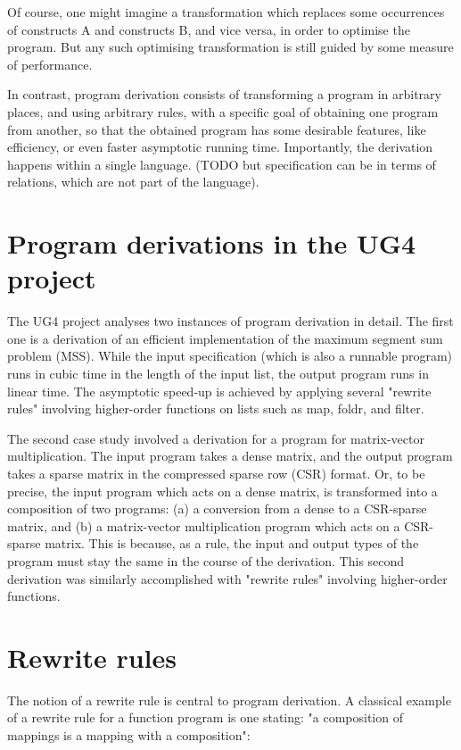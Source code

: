 \documentclass[bsc,frontabs,twoside,singlespacing,parskip,deptreport]{infthesis}
\theoremstyle{definition}
\begin{document}
Of course, one might imagine a transformation which replaces some
occurrences of constructs A and constructs B, and vice versa, in order
to optimise the program. But any such optimising transformation is
still guided by some measure of performance.

In contrast, program derivation consists of transforming a program in
arbitrary places, and using arbitrary rules, with a specific goal of
obtaining one program from another, so that the obtained program has
some desirable features, like efficiency, or even faster asymptotic
running time. Importantly, the derivation happens within a single
language. (TODO but specification can be in terms of relations, which
are not part of the language).

\section{Program derivations in the UG4 project}
\label{sec:progr-deriv-ug4}

The UG4 project analyses two instances of program derivation in
detail. The first one is a derivation of an efficient implementation
of the maximum segment sum problem (MSS). While the input
specification (which is also a runnable program) runs in cubic time in
the length of the input list, the output program runs in linear
time. The asymptotic speed-up is achieved by applying several "rewrite
rules" involving higher-order functions on lists such as map, foldr,
and filter.

The second case study involved a derivation for a program for
matrix-vector multiplication. The input program takes a dense matrix,
and the output program takes a sparse matrix in the compressed sparse
row (CSR) format. Or, to be precise, the input program which acts on a
dense matrix, is transformed into a composition of two programs: (a) a
conversion from a dense to a CSR-sparse matrix, and (b) a
matrix-vector multiplication program which acts on a CSR-sparse
matrix. This is because, as a rule, the input and output types of the
program must stay the same in the course of the derivation. This
second derivation was similarly accomplished with "rewrite rules"
involving higher-order functions.

\section{Rewrite rules}
\label{sec:rewrite-rules}

The notion of a rewrite rule is central to program derivation. A
classical example of a rewrite rule for a function program is one
stating: "a composition of mappings is a mapping with a composition":
\end{document}
